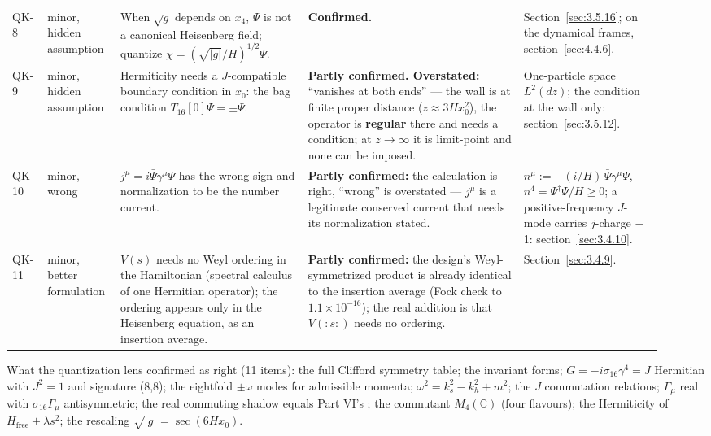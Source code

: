 {\begin{longtable}{@{}p{0.055\linewidth}p{0.095\linewidth}p{0.270\linewidth}p{0.310\linewidth}p{0.200\linewidth}@{}}
\raggedright QK-8 & \raggedright minor, hidden assumption & \raggedright When $\sqrt{g}$ depends on $x_{4}$, $\Psi$ is not a canonical Heisenberg field; quantize $\chi = (\sqrt{|g|}/H)^{1/2} \Psi$. & \raggedright \textbf{Confirmed.} & \raggedright Section~\ref{sec:3.5.16}; on the dynamical frames, section~\ref{sec:4.4.6}. \tabularnewline
\raggedright QK-9 & \raggedright minor, hidden assumption & \raggedright Hermiticity needs a $J$-compatible boundary condition in $x_{0}$: the bag condition $T_{16}[0] \Psi = \pm \Psi$. & \raggedright \textbf{Partly confirmed. Overstated:} ``vanishes at both ends'' --- the wall is at finite proper distance ($z\approx3Hx_0^2$), the operator is \textbf{regular} there and needs a condition; at $z \to \infty$ it is limit-point and none can be imposed. & \raggedright One-particle space $L^2(dz)$; the condition at the wall only: section~\ref{sec:3.5.12}. \tabularnewline
\raggedright QK-10 & \raggedright minor, wrong & \raggedright $j^{\mu} = i \bar\Psi \gamma^{\mu} \Psi$ has the wrong sign and normalization to be the number current. & \raggedright \textbf{Partly confirmed:} the calculation is right, ``wrong'' is overstated --- $j^{\mu}$ is a legitimate conserved current that needs its normalization stated. & \raggedright $n^\mu:=-(i/H)\,\bar\Psi\gamma^\mu\Psi$, $n^{4} = \Psi^{\dagger} \Psi/H \geq 0$; a positive-frequency $J$-mode carries $j$-charge \ensuremath{-}1: section~\ref{sec:3.4.10}. \tabularnewline
\raggedright QK-11 & \raggedright minor, better formulation & \raggedright $V(s)$ needs no Weyl ordering in the Hamiltonian (spectral calculus of one Hermitian operator); the ordering appears only in the Heisenberg equation, as an insertion average. & \raggedright \textbf{Partly confirmed:} the design's Weyl-symmetrized product is already identical to the insertion average (Fock check to $1.1\times10^{-16}$); the real addition is that $V({:}s{:})$ needs no ordering. & \raggedright Section~\ref{sec:3.4.9}. \tabularnewline
\bottomrule
\end{longtable}
}

What the quantization lens confirmed as right (11 items): the full Clifford symmetry table; the invariant forms; $G = -i \sigma_{16} \gamma^{4} = J$ Hermitian with $J^{2} = 1$ and signature (8,8); the eightfold $\pm \omega$ modes for admissible momenta; $\omega^{2} = k_s^{2} - k_h^{2} + m^{2}$; the $J$ commutation relations; $\Gamma_{\mu}$ real with $\sigma_{16} \Gamma_{\mu}$ antisymmetric; the real commuting shadow equals Part VI's ; the commutant $M_4(\mathbb{C})$ (four flavours); the Hermiticity of $H_{\mathrm{free}} + \lambda s^{2}$; the rescaling $\sqrt{|g|}=\sec(6Hx_0)$.

